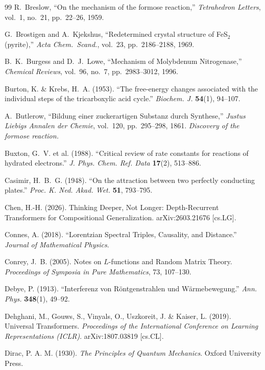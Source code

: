 \documentclass[12pt,oneside]{book}
\theoremstyle{principia}
\theoremstyle{definition}
\theoremstyle{remark}
\begin{document}
\begin{thebibliography}{99}
R.~Breslow,
``On the mechanism of the formose reaction,''
\emph{Tetrahedron Letters}, vol.~1, no.~21, pp.~22--26, 1959.

G.~Brostigen and A.~Kjekshus,
``Redetermined crystal structure of FeS$_2$ (pyrite),''
\emph{Acta Chem.\ Scand.}, vol.~23, pp.~2186--2188, 1969.

B.~K.~Burgess and D.~J.~Lowe,
``Mechanism of Molybdenum Nitrogenase,''
\emph{Chemical Reviews}, vol.~96, no.~7, pp.~2983--3012, 1996.

Burton, K. \& Krebs, H.~A. (1953).
``The free-energy changes associated with the individual steps of the tricarboxylic acid cycle.''
\textit{Biochem. J.} \textbf{54}(1), 94--107.

A.~Butlerow,
``Bildung einer zuckerartigen Substanz durch Synthese,''
\emph{Justus Liebigs Annalen der Chemie}, vol.~120, pp.~295--298, 1861.
\textit{Discovery of the formose reaction.}

Buxton, G.~V. et al. (1988).
``Critical review of rate constants for reactions of hydrated electrons.''
\textit{J. Phys. Chem. Ref. Data} \textbf{17}(2), 513--886.

Casimir, H.~B.~G. (1948).
``On the attraction between two perfectly conducting plates.''
\textit{Proc. K. Ned. Akad. Wet.} \textbf{51}, 793--795.

Chen, H.-H. (2026).
Thinking Deeper, Not Longer: Depth-Recurrent Transformers for Compositional Generalization.
arXiv:2603.21676 [cs.LG].

Connes, A. (2018).
``Lorentzian Spectral Triples, Causality, and Distance.''
\textit{Journal of Mathematical Physics}.

Conrey, J.~B. (2005).
Notes on $L$-functions and Random Matrix Theory.
\textit{Proceedings of Symposia in Pure Mathematics}, 73, 107--130.

Debye, P. (1913).
``Interferenz von R\"ontgenstrahlen und W\"armebewegung.''
\textit{Ann. Phys.} \textbf{348}(1), 49--92.

Dehghani, M., Gouws, S., Vinyals, O., Uszkoreit, J. \& Kaiser, L. (2019).
Universal Transformers.
\textit{Proceedings of the International Conference on Learning Representations (ICLR)}.
arXiv:1807.03819 [cs.CL].

Dirac, P. A. M. (1930).
\textit{The Principles of Quantum Mechanics}.
Oxford University Press.


\end{thebibliography}
\end{document}
